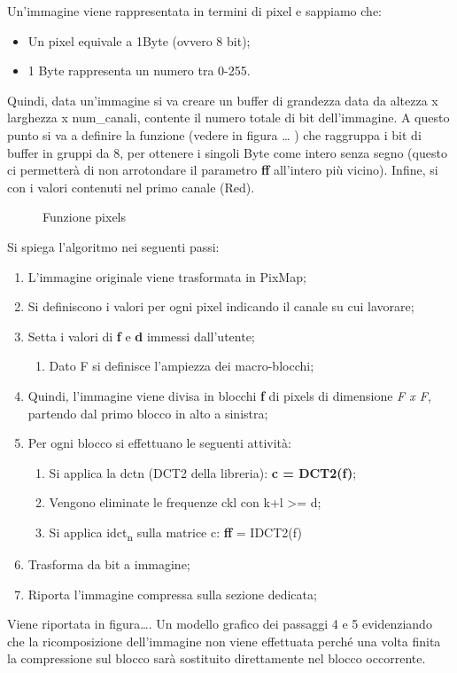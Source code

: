 \documentclass[12pt]{article}
\begin{document}
	Un’immagine viene rappresentata in termini di pixel e sappiamo che:
	\begin{itemize}
		\item Un pixel equivale a 1Byte (ovvero 8 bit);
		\item 1 Byte rappresenta un numero tra 0-255.
	\end{itemize}
	
Quindi, data un’immagine si va creare un buffer di grandezza data da altezza x larghezza x num\_canali, contente il numero totale di bit dell'immagine. A questo punto si va a definire la funzione (vedere in figura … ) che raggruppa i bit di buffer in gruppi da 8, per ottenere i singoli Byte come intero senza segno (questo ci permetterà di non arrotondare il parametro \textbf{ff} all’intero più vicino). \newline
Infine, si con i valori contenuti nel primo canale (Red).
\begin{figure}[H]
    \caption{Funzione pixels}
    \label{fig:pixels}
\end{figure}

Si spiega l’algoritmo nei seguenti passi:
\begin{enumerate}
	\item L’immagine originale viene trasformata in PixMap;
	\item Si definiscono i valori per ogni pixel indicando il canale su cui lavorare;
	\item Setta i valori di \textbf{f} e \textbf{d} immessi dall’utente;
	\begin{enumerate}
		\item Dato F si definisce l’ampiezza dei macro-blocchi;
	\end{enumerate}
	\item Quindi, l’immagine viene divisa in blocchi \textbf{f} di pixels di dimensione \emph{F x F}, partendo dal primo blocco in alto a sinistra;
	\item Per ogni blocco si effettuano le seguenti attività:
	\begin{enumerate}
		\item Si applica la dctn (DCT2 della libreria): \textbf{c = DCT2(f)};
		\item Vengono eliminate le frequenze ckl con k+l >= d;
		\item Si applica idct\textsubscript{n} sulla matrice c: \textbf{ff} = IDCT2(f)
	\end{enumerate}
	\item Trasforma da bit a immagine;
	\item Riporta l’immagine compressa sulla sezione dedicata;
\end{enumerate}
Viene riportata in figura…. Un modello grafico dei passaggi 4 e 5 evidenziando che la ricomposizione dell’immagine non viene effettuata perché una volta finita la compressione sul blocco sarà sostituito direttamente nel blocco occorrente.
\end{document}
